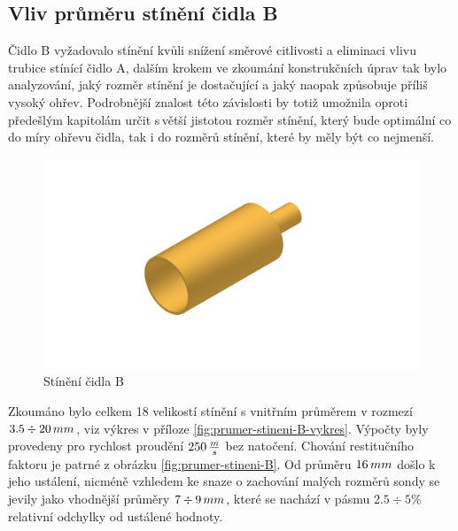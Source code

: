     \subsection{Vliv průměru stínění čidla B}
        Čidlo B vyžadovalo stínění kvůli snížení směrové citlivosti a eliminaci vlivu trubice stínící čidlo A, dalším krokem ve zkoumání konstrukčních úprav tak bylo analyzování, jaký rozměr stínění je dostačující a jaký naopak způsobuje příliš vysoký ohřev. Podrobnější znalost této závislosti by totiž umožnila oproti předešlým kapitolám určit s\,větší jistotou rozměr stínění, který bude optimální co do míry ohřevu čidla, tak i do rozměrů stínění, které by měly být co nejmenší. 
        \begin{figure}[ht!]
            \centering
            \includegraphics[width=\textwidth]{400_SIMULACE_KONSTRUKCNICH_UPRAV/Vykresy_rendery/Stineni_B.png}
            \caption{Stínění čidla B}
            \label{fig:stineni-B}
        \end{figure}

        Zkoumáno bylo celkem 18 velikostí stínění s vnitřním průměrem v rozmezí \linebreak$3.5 \div 20\, mm$, viz výkres v příloze \ref{fig:prumer-stineni-B-vykres}. Výpočty byly provedeny pro rychlost proudění $250 \, \frac{m}{s}$ bez natočení. Chování restitučního faktoru je patrné z obrázku \ref{fig:prumer-stineni-B}. Od průměru $16 \, mm$ došlo k jeho ustálení, nicméně vzhledem ke snaze o zachování malých rozměrů sondy se jevily jako vhodnější průměry $7 \div 9 \, mm$, které se nachází v pásmu $2.5 \div 5 \%$ relativní odchylky od ustálené hodnoty.
        
